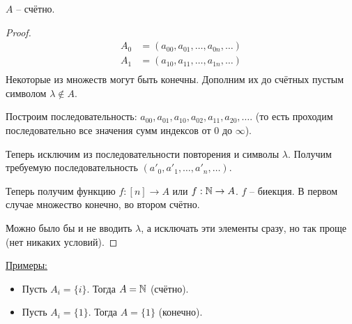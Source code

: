 \begin{enumerate}
	\statement $A$ -- счётно.
	\begin{proof}
		\begin{align*}
		A_0 &= (a_{00}, a_{01}, \ldots, a_{0n}, \ldots) \\
		A_1 &= (a_{10}, a_{11}, \ldots, a_{1n}, \ldots) \\
		\end{align*}
		Некоторые из множеств могут быть конечны. Дополним их до счётных
		пустым символом $\lambda \notin A$.
		
		Построим последовательность: $a_{00}, a_{01}, a_{10}, a_{02},
		a_{11}, a_{20}, \ldots$. (то есть проходим последовательно все значения
		сумм индексов от $0$ до $\infty$).
		
		Теперь исключим из последовательности повторения и символы $\lambda$.
		Получим требуемую последовательность $(a'_0, a'_1, \ldots, a'_n, \ldots)$.
		
		Теперь получим функцию $f: [n] \to A$ или $f: \mathbb{N} \to A$. $f$ -- биекция.
		В первом случае множество конечно, во втором счётно.
		
		Можно было бы и не вводить $\lambda$, а исключать эти элементы сразу,
		но так проще (нет никаких условий).
	\end{proof}
	
	\underline{Примеры:} 
	\begin{itemize}
		\item Пусть $A_i = \{i\}$. Тогда $A = \mathbb{N}$ (счётно).
		\item Пусть $A_i = \{1\}$. Тогда $A = \{1\}$ (конечно).
	\end{itemize}
	

\end{enumerate}
